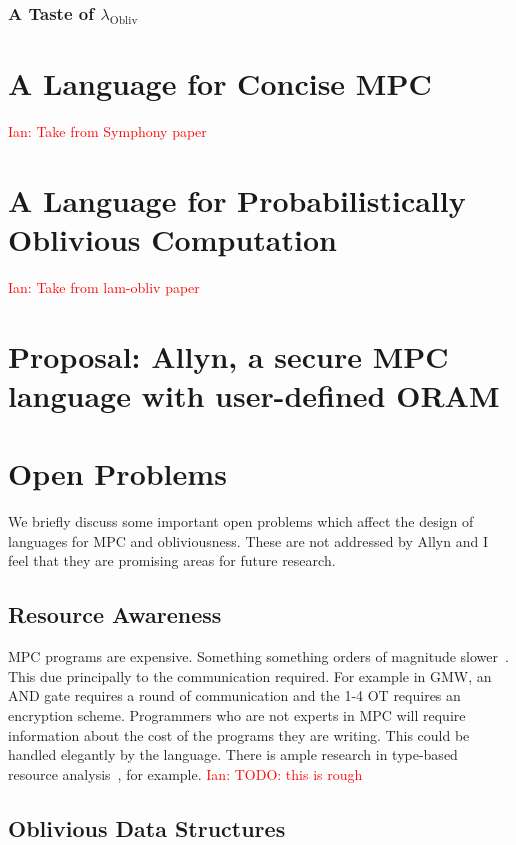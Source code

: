 \documentclass{report}
\newcommand{\lang}{Allyn\xspace}
\newcommand{\obliv}{\ensuremath{\lambda_{\mathrm{Obliv}}}\xspace}
\newcommand{\ins}[1]{\textcolor{red}{Ian: #1}}
\begin{document}
\subsection{A Taste of \obliv}

\chapter{A Language for Concise MPC}

\ins{Take from Symphony paper}

\chapter{A Language for Probabilistically Oblivious Computation}

\ins{Take from lam-obliv paper}

\chapter{Proposal: \lang{}, a secure MPC language with user-defined ORAM}

\chapter{Open Problems}

We briefly discuss some important open problems which affect the design of languages for
MPC and obliviousness. These are not addressed by \lang and I feel that they are promising
areas for future research.

\section{Resource Awareness}

MPC programs are expensive. Something something orders of magnitude slower~\cite{}. This due principally to the communication
required. For example in GMW, an AND gate requires a round of communication and the 1-4 OT requires an encryption scheme.
Programmers who are not experts in MPC will require information about the cost of the programs they are writing. This could be
handled elegantly by the language. There is ample research in type-based resource analysis~\cite{}, for example. \ins{TODO: this is rough}

\section{Oblivious Data Structures}
\end{document}
